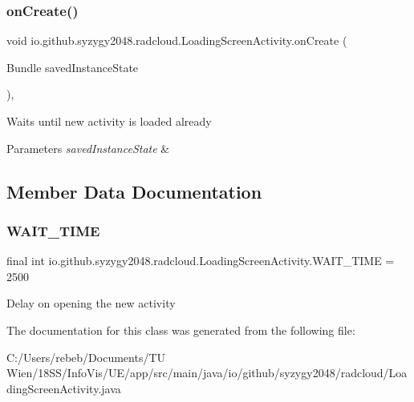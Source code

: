 \subsubsection{\texorpdfstring{on\+Create()}{onCreate()}}
{\footnotesize\ttfamily void io.\+github.\+syzygy2048.\+radcloud.\+Loading\+Screen\+Activity.\+on\+Create (\begin{DoxyParamCaption}\item[{Bundle}]{saved\+Instance\+State }\end{DoxyParamCaption})\hspace{0.3cm}{\ttfamily [inline]}, {\ttfamily [protected]}}

Waits until new activity is loaded already 
\begin{DoxyParams}{Parameters}
{\em saved\+Instance\+State} & \\
\hline
\end{DoxyParams}


\subsection{Member Data Documentation}
\mbox{\label{classio_1_1github_1_1syzygy2048_1_1radcloud_1_1_loading_screen_activity_a8dc1db6478b13139cebca00f957738fd}} 
\subsubsection{\texorpdfstring{W\+A\+I\+T\+\_\+\+T\+I\+ME}{WAIT\_TIME}}
{\footnotesize\ttfamily final int io.\+github.\+syzygy2048.\+radcloud.\+Loading\+Screen\+Activity.\+W\+A\+I\+T\+\_\+\+T\+I\+ME = 2500\hspace{0.3cm}{\ttfamily [private]}}

Delay on opening the new activity 

The documentation for this class was generated from the following file\+:\begin{DoxyCompactItemize}
\item 
C\+:/\+Users/rebeb/\+Documents/\+T\+U Wien/18\+S\+S/\+Info\+Vis/\+U\+E/app/src/main/java/io/github/syzygy2048/radcloud/Loading\+Screen\+Activity.\+java\end{DoxyCompactItemize}

